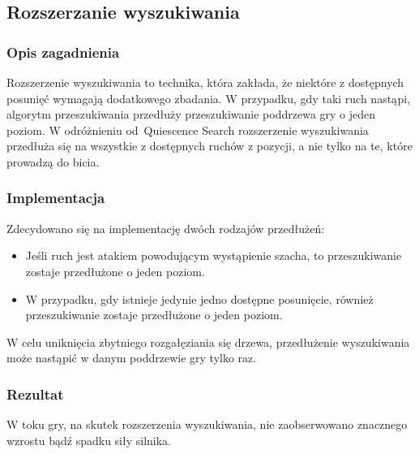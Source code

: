 \subsection{Rozszerzanie wyszukiwania}
\label{subsec:rozszerzanie-wyszukiwania}

\subsubsection{Opis zagadnienia}
Rozszerzenie wyszukiwania to technika, która zakłada, że niektóre z dostępnych posunięć wymagają dodatkowego zbadania.
W przypadku, gdy taki ruch nastąpi, algorytm przeszukiwania przedłuży przeszukiwanie poddrzewa gry o jeden poziom.
W odróżnieniu od~Quiescence Search rozszerzenie wyszukiwania przedłuża się na wszystkie z dostępnych ruchów z pozycji, a nie tylko na te, które prowadzą do bicia.

\subsubsection{Implementacja}
Zdecydowano się na implementację dwóch rodzajów przedłużeń:
\begin{itemize}
    \item Jeśli ruch jest atakiem powodującym wystąpienie szacha, to przeszukiwanie zostaje przedłużone o jeden poziom.
    \item W przypadku, gdy istnieje jedynie jedno dostępne posunięcie, również przeszukiwanie zostaje przedłużone o jeden poziom.
\end{itemize}
W celu uniknięcia zbytniego rozgałęziania się drzewa, przedłużenie wyszukiwania może nastąpić w danym poddrzewie gry tylko raz.
\subsubsection{Rezultat}
W toku gry, na skutek rozszerzenia wyszukiwania, nie zaobserwowano znacznego wzrostu bądź spadku siły silnika.

